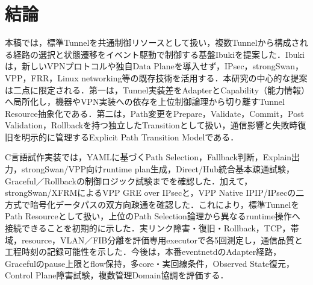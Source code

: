\documentclass[11pt,a4paper,twoside]{ltjsarticle}
\begin{document}
\section{結論}
本稿では，標準Tunnelを共通制御リソースとして扱い，複数Tunnelから構成される経路の選択と状態遷移をイベント駆動で制御する基盤Ibukiを提案した．Ibukiは，新しいVPNプロトコルや独自Data Planeを導入せず，IPsec，strongSwan，VPP，FRR，Linux networking等の既存技術を活用する．本研究の中心的な提案は二点に限定される．第一は，Tunnel実装差をAdapterとCapability（能力情報）へ局所化し，機器やVPN実装への依存を上位制御論理から切り離すTunnel Resource抽象化である．第二は，Path変更をPrepare，Validate，Commit，Post Validation，Rollbackを持つ独立したTransitionとして扱い，通信影響と失敗時復旧を明示的に管理するExplicit Path Transition Modelである．

C言語試作実装では，YAMLに基づくPath Selection，Fallback判断，Explain出力，strongSwan/VPP向けruntime plan生成，Direct/Hub統合基本疎通試験，Graceful／Rollbackの制御ロジック試験までを確認した．加えて，strongSwan/XFRMによるVPP GRE over IPsecと，VPP Native IPIP/IPsecの二方式で暗号化データパスの双方向疎通を確認した．これにより，標準TunnelをPath Resourceとして扱い，上位のPath Selection論理から異なるruntime操作へ接続できることを初期的に示した．実リンク障害・復旧・Rollback，TCP，帯域，resource，VLAN／FIB分離を評価専用executorで各5回測定し，通信品質と工程時刻の記録可能性を示した．今後は，本番eventnetdのAdapter経路，Gracefulのpause上限とflow保持，多core・実回線条件，Observed State復元，Control Plane障害試験，複数管理Domain協調を評価する．
\end{document}
